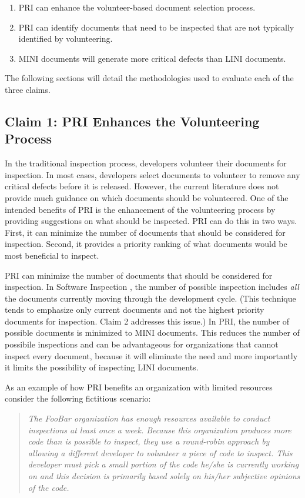 \begin{enumerate}
\item PRI can enhance the volunteer-based document selection process. 
\item PRI can identify documents that need to be inspected that are not
  typically identified by volunteering.
\item MINI documents will generate more critical defects than LINI
  documents.
\end{enumerate}

The following sections will detail the methodologies used to evaluate each
of the three claims.


\subsection{Claim 1: PRI Enhances the Volunteering Process}
\label{sec:claim1}
In the traditional inspection process, developers volunteer their documents
for inspection. In most cases, developers select documents to volunteer to
remove any critical defects before it is released. However, the current
literature does not provide much guidance on which documents should be
volunteered. One of the intended benefits of PRI is the enhancement of the
volunteering process by providing suggestions on what should be inspected.
PRI can do this in two ways. First, it can minimize the number of documents
that should be considered for inspection. Second, it provides a priority
ranking of what documents would be most beneficial to inspect.

PRI can minimize the number of documents that should be considered for
inspection. In Software Inspection \cite{Gilb93}, the number of possible
inspection includes \textit{all} the documents currently moving through the
development cycle.  (This technique tends to emphasize only current
documents and not the highest priority documents for inspection. Claim 2
addresses this issue.)  In PRI, the number of possible documents is
minimized to MINI documents. This reduces the number of possibile
inspections and can be advantageous for organizations that cannot inspect
every document, because it will eliminate the need and more importantly it
limits the possibility of inspecting LINI documents.

As an example of how PRI benefits an organization with limited resources
consider the following fictitious scenario:

\begin{quotation}
  \textit{ The FooBar organization has enough resources available to
    conduct inspections at least once a week. Because this organization
    produces more code than is possible to inspect, they use a round-robin
    approach by allowing a different developer to volunteer a piece of code
    to inspect. This developer must pick a small portion of the code he/she
    is currently working on and this decision is primarily based solely on
    his/her subjective opinions of the code.  }
\end{quotation}


